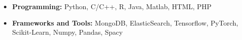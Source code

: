 
\begin{itemize}[nosep]
\vspace{.5em}
    \item \textbf{Programming:} Python, C/C++, R, Java, Matlab,
  HTML, PHP

  \item \textbf{Frameworks and Tools:} MongoDB, ElasticSearch, Tensorflow, PyTorch, Scikit-Learn, Numpy, Pandas, Spacy
\end{itemize}

